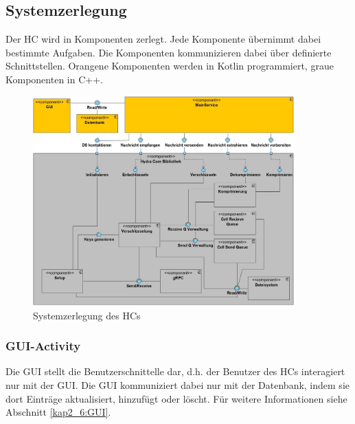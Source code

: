 \subsection{Systemzerlegung}
Der \ac{HC} wird in Komponenten zerlegt. 
Jede Komponente übernimmt dabei bestimmte Aufgaben. 
Die Komponenten kommunizieren dabei über definierte Schnittstellen.
Orangene Komponenten werden in Kotlin programmiert, graue Komponenten in C++.

\begin{figure}[h]
  \centering
     \includegraphics[width=0.9\textwidth]{diagramme/Component_Diagram_E2.jpg}
  \caption{Systemzerlegung des \acp{HC}}
  \label{fig:Bild1}
\end{figure}

\subsubsection{GUI-Activity}
Die \ac{GUI} stellt die Benutzerschnittelle dar, d.h. der Benutzer des \acp{HC} interagiert nur mit der \ac{GUI}. 
Die \ac{GUI} kommuniziert dabei nur mit der Datenbank, indem sie dort Einträge aktualisiert, hinzufügt oder löscht.
Für weitere Informationen siehe Abschnitt \ref{kap2_6:GUI}.

